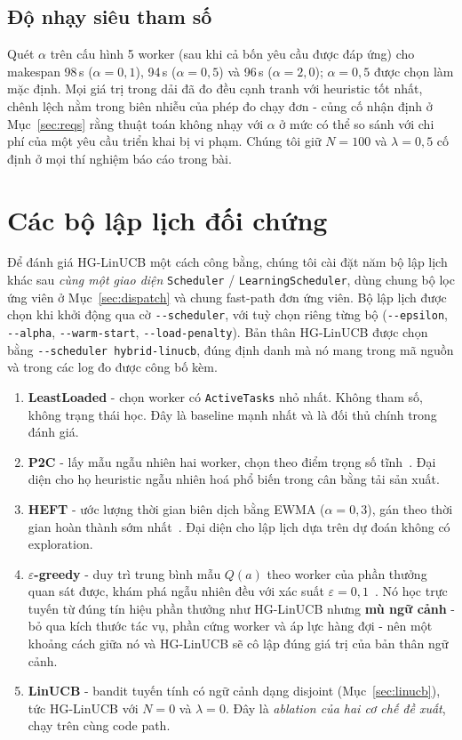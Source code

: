\documentclass[final,5p,times,twocolumn]{elsarticle}
\begin{document}
\subsection{Độ nhạy siêu tham số}
\label{sec:sensitivity}

Quét $\alpha$ trên cấu hình 5 worker (sau khi cả bốn yêu cầu được đáp ứng) cho makespan 98\,s ($\alpha=0{,}1$), 94\,s ($\alpha=0{,}5$) và 96\,s ($\alpha=2{,}0$); $\alpha=0{,}5$ được chọn làm mặc định. Mọi giá trị trong dải đã đo đều cạnh tranh với heuristic tốt nhất, chênh lệch nằm trong biên nhiễu của phép đo chạy đơn - củng cố nhận định ở Mục~\ref{sec:reqs} rằng thuật toán không nhạy với $\alpha$ ở mức có thể so sánh với chi phí của một yêu cầu triển khai bị vi phạm. Chúng tôi giữ $N=100$ và $\lambda=0{,}5$ cố định ở mọi thí nghiệm báo cáo trong bài.

\section{Các bộ lập lịch đối chứng}
\label{sec:baselines}

Để đánh giá HG-LinUCB một cách công bằng, chúng tôi cài đặt năm bộ lập lịch khác sau \emph{cùng một giao diện} \texttt{Scheduler} / \texttt{LearningScheduler}, dùng chung bộ lọc ứng viên ở Mục~\ref{sec:dispatch} và chung fast-path đơn ứng viên. Bộ lập lịch được chọn khi khởi động qua cờ \texttt{-{}-scheduler}, với tuỳ chọn riêng từng bộ (\texttt{-{}-epsilon}, \texttt{-{}-alpha}, \texttt{-{}-warm-start}, \texttt{-{}-load-penalty}). Bản thân HG-LinUCB được chọn bằng \texttt{-{}-scheduler hybrid-linucb}, đúng định danh mà nó mang trong mã nguồn và trong các log đo được công bố kèm.

\begin{enumerate}
\item \textbf{LeastLoaded} - chọn worker có \texttt{ActiveTasks} nhỏ nhất. Không tham số, không trạng thái học. Đây là baseline mạnh nhất và là đối thủ chính trong đánh giá.
\item \textbf{P2C} - lấy mẫu ngẫu nhiên hai worker, chọn theo điểm trọng số tĩnh~\cite{mitzenmacher2001}. Đại diện cho họ heuristic ngẫu nhiên hoá phổ biến trong cân bằng tải sản xuất.
\item \textbf{HEFT} - ước lượng thời gian biên dịch bằng EWMA ($\alpha=0{,}3$), gán theo thời gian hoàn thành sớm nhất~\cite{heft}. Đại diện cho lập lịch dựa trên dự đoán không có exploration.
\item \textbf{$\varepsilon$-greedy} - duy trì trung bình mẫu $Q(a)$ theo worker của phần thưởng quan sát được, khám phá ngẫu nhiên đều với xác suất $\varepsilon=0{,}1$~\cite{sutton2018}. Nó học trực tuyến từ đúng tín hiệu phần thưởng như HG-LinUCB nhưng \textbf{mù ngữ cảnh} - bỏ qua kích thước tác vụ, phần cứng worker và áp lực hàng đợi - nên một khoảng cách giữa nó và HG-LinUCB sẽ cô lập đúng giá trị của bản thân ngữ cảnh.
\item \textbf{LinUCB} - bandit tuyến tính có ngữ cảnh dạng disjoint (Mục~\ref{sec:linucb}), tức HG-LinUCB với $N=0$ và $\lambda=0$. Đây là \emph{ablation của hai cơ chế đề xuất}, chạy trên cùng code path.
\end{enumerate}
\end{document}
